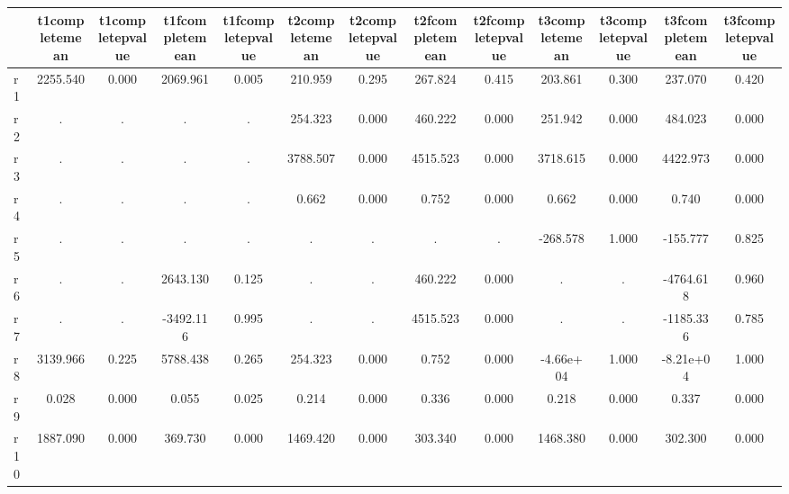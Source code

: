 \begin{table}[htbp]
\begin{tabular}{lcccccccccccc} \hline \hline
 & t1completemean  & t1completepvalue  & t1fcompletemean  & t1fcompletepvalue  & t2completemean  & t2completepvalue  & t2fcompletemean  & t2fcompletepvalue  & t3completemean  & t3completepvalue  & t3fcompletemean  & t3fcompletepvalue  \\  \hline 
r1 &  2255.540 &     0.000 &  2069.961 &     0.005 &   210.959 &     0.295 &   267.824 &     0.415 &   203.861 &     0.300 &   237.070 &     0.420 \\  
r2 &         . &         . &         . &         . &   254.323 &     0.000 &   460.222 &     0.000 &   251.942 &     0.000 &   484.023 &     0.000 \\  
r3 &         . &         . &         . &         . &  3788.507 &     0.000 &  4515.523 &     0.000 &  3718.615 &     0.000 &  4422.973 &     0.000 \\  
r4 &         . &         . &         . &         . &     0.662 &     0.000 &     0.752 &     0.000 &     0.662 &     0.000 &     0.740 &     0.000 \\  
r5 &         . &         . &         . &         . &         . &         . &         . &         . &  -268.578 &     1.000 &  -155.777 &     0.825 \\  
r6 &         . &         . &  2643.130 &     0.125 &         . &         . &   460.222 &     0.000 &         . &         . & -4764.618 &     0.960 \\  
r7 &         . &         . & -3492.116 &     0.995 &         . &         . &  4515.523 &     0.000 &         . &         . & -1185.336 &     0.785 \\  
r8 &  3139.966 &     0.225 &  5788.438 &     0.265 &   254.323 &     0.000 &     0.752 &     0.000 & -4.66e+04 &     1.000 & -8.21e+04 &     1.000 \\  
r9 &     0.028 &     0.000 &     0.055 &     0.025 &     0.214 &     0.000 &     0.336 &     0.000 &     0.218 &     0.000 &     0.337 &     0.000 \\  
r10 &  1887.090 &     0.000 &   369.730 &     0.000 &  1469.420 &     0.000 &   303.340 &     0.000 &  1468.380 &     0.000 &   302.300 &     0.000 \\  
\hline \hline \end{tabular}
\end{table}
